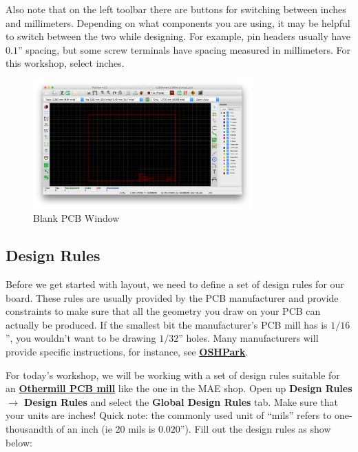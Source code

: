 \documentclass[12pt, oneside]{article}
\begin{document}
Also note that on the left toolbar there are buttons for switching between inches and millimeters. Depending on what components you are using, it may be helpful to switch between the two while designing. For example, pin headers usually have $0.1$'' spacing, but some screw terminals have spacing measured in millimeters. For this workshop, select inches.

\begin{figure}[H]
\includegraphics[width=0.75\textwidth]{EmptyPCB}
\centering
\caption{Blank PCB Window}
\end{figure}

\subsection{Design Rules}
Before we get started with layout, we need to define a set of design rules for our board. These rules are usually provided by the PCB manufacturer and provide constraints to make sure that all the geometry you draw on your PCB can actually be produced. If the smallest bit the manufacturer's PCB mill has is $1/16$'', you wouldn't want to be drawing $1/32$'' holes. Many manufacturers will provide specific instructions, for instance, see \textbf{\href{http://docs.oshpark.com/design-tools/kicad/kicad-design-rules/}{OSHPark}}.

For today's workshop, we will be working with a set of design rules suitable for an \textbf{\href{https://othermachine.co/support/pcb/design-considerations/}{Othermill PCB mill}} like the one in the MAE shop. Open up \textbf{Design Rules $\rightarrow$ Design Rules} and select the \textbf{Global Design Rules} tab. Make sure that your units are inches! Quick note: the commonly used unit of ``mils'' refers to one-thousandth of an inch (ie 20 mils is $0.020$''). Fill out the design rules as show below:
\end{document}
